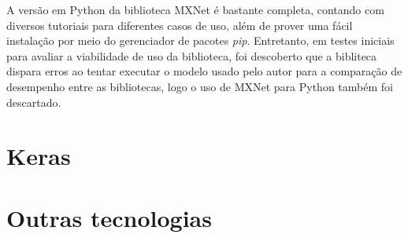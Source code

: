 A versão em Python da biblioteca MXNet é bastante completa, contando com diversos tutoriais para diferentes casos de uso, além de prover uma fácil instalação por meio do gerenciador de pacotes \textit{pip}. Entretanto, em testes iniciais para avaliar a viabilidade de uso da biblioteca, foi descoberto que a bibliteca dispara erros ao tentar executar o modelo usado pelo autor \cite{eon_ml_classifier_2020} para a comparação de desempenho entre as bibliotecas, logo o uso de MXNet para Python também foi descartado.

\section{Keras}

\section{Outras tecnologias}

